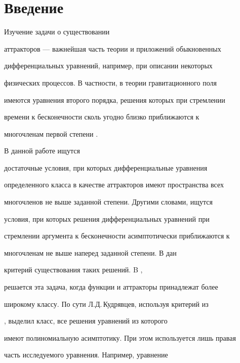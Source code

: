 \label{begin}











\section{Введение}





Изучение задачи о существовании


аттракторов --- важнейшая часть теории и приложений обыкновенных


дифференциальных уравнений, например, при описании некоторых


физических процессов. В частности, в теории гравитационного поля


имеются уравнения второго порядка, решения которых при стремлении


времени к бесконечности сколь угодно близко приближаются к


многочленам первой степени \cite{1}. 





В данной работе ищутся


достаточные условия, при которых дифференциальные уравнения


определенного класса в качестве аттракторов имеют пространства всех


многочленов не выше заданной степени. Другими словами, ищутся


условия, при которых решения дифференциальных уравнений при


стремлении аргумента к бесконечности асимптотически приближаются к


многочленам не выше наперед заданной степени. В \cite{2} дан


критерий существования таких решений. B \cite{3},


\cite{4} решается эта задача, когда функции и аттракторы принадлежат более


широкому классу. По сути Л.Д.\,Кудрявцев, используя критерий из 


\cite{2}, выделил класс, все решения уравнений из которого


имеют полиномиальную асимптотику. При этом используется лишь правая


часть исследуемого уравнения. Например, уравнение


